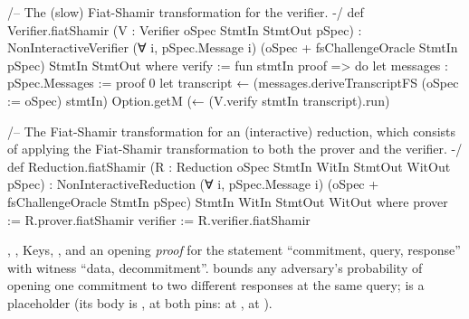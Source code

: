 

\begin{leancode}
/-- The (slow) Fiat-Shamir transformation for the verifier. -/
def Verifier.fiatShamir (V : Verifier oSpec StmtIn StmtOut pSpec) :
    NonInteractiveVerifier (∀ i, pSpec.Message i) (oSpec + fsChallengeOracle StmtIn pSpec)
      StmtIn StmtOut where
  verify := fun stmtIn proof => do
    let messages : pSpec.Messages := proof 0
    let transcript ← (messages.deriveTranscriptFS (oSpec := oSpec) stmtIn)
    Option.getM (← (V.verify stmtIn transcript).run)

/-- The Fiat-Shamir transformation for an (interactive) reduction, which consists of applying the
  Fiat-Shamir transformation to both the prover and the verifier. -/
def Reduction.fiatShamir (R : Reduction oSpec StmtIn WitIn StmtOut WitOut pSpec) :
    NonInteractiveReduction (∀ i, pSpec.Message i) (oSpec + fsChallengeOracle StmtIn pSpec)
      StmtIn WitIn StmtOut WitOut where
  prover := R.prover.fiatShamir
  verifier := R.verifier.fiatShamir
\end{leancode}


\begin{define}{, , }
Keys, , and an opening
\emph{proof} for the statement \enquote{commitment, query, response} with witness \enquote{data,
decommitment}.  bounds any adversary's probability of opening one commitment to two
different responses at the same query;  is a placeholder (its body is
, at both pins: \allowbreak{}\allowbreak{} at ,
 at ).
\end{define}

